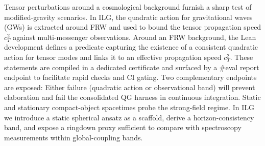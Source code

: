 \documentclass[aps,prd,twocolumn,superscriptaddress,nofootinbib,floatfix,longbibliography]{revtex4-2}
\newcommand{\lean}[1]{\texttt{\detokenize{#1}}}
\begin{document}
%
Tensor perturbations around a cosmological background furnish a sharp test of modified-gravity scenarios. In ILG, the quadratic action for gravitational waves (GWs) is extracted around FRW and used to bound the tensor propagation speed $c_T^2$ against multi-messenger observations.
%
Around an FRW background, the Lean development defines a predicate capturing the existence of a consistent quadratic action for tensor modes and links it to an effective propagation speed $c_T^2$. These statements are compiled in a dedicated certificate and surfaced by a \#eval report endpoint to facilitate rapid checks and CI gating.
%
Two complementary endpoints are exposed:
Either failure (quadratic action or observational band) will prevent elaboration and fail the consolidated QG harness in continuous integration.
%
%
%
Static and stationary compact-object spacetimes probe the strong-field regime. In ILG we introduce a static spherical ansatz as a scaffold, derive a horizon-consistency band, and expose a ringdown proxy sufficient to compare with spectroscopy measurements within global-coupling bands.
\end{document}
